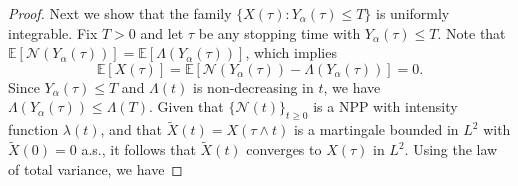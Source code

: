 \documentclass[11pt,oneside,reqno]{amsart}
\theoremstyle{definition}
\theoremstyle{remarkstyle}
\begin{document}
\begin{proof}
 Next we show that the family \(\{X(\tau):Y_\alpha(\tau)\le T\}\) is uniformly integrable. Fix \(T>0\) and let \(\tau\) be any stopping time with \(Y_\alpha(\tau)\le T\). Note that  $\mathbb{E}\left[\mathcal{N}(Y_\alpha(\tau))\right]=\mathbb{E}\left[\Lambda(Y_\alpha(\tau))\right]$, which implies 
 \begin{equation}\label{mean_nfpp_martingale}
     \mathbb{E}\left[X(\tau)\right]=\mathbb{E}\left[\mathcal{N}(Y_\alpha(\tau))-\Lambda(Y_\alpha(\tau))\right]=0.
 \end{equation}
Since $Y_{\alpha}(\tau) \le T$ and $\Lambda(t)$ is non-decreasing in $t$, we have $\Lambda\!\left(Y_{\alpha}(\tau)\right) \le \Lambda(T)$. Given that \(\{\mathcal{N}(t)\}_{t\ge 0}\) is a NPP with intensity function \(\lambda(t)\), and that \(\widetilde{X}(t)=X(\tau\wedge t)\) is a martingale bounded in \(L^2\) with \(\widetilde{X}(0)=0\) a.s., it follows that \(\widetilde{X}(t)\) converges to \(X(\tau)\) in \(L^2\). Using the law of total variance, we have 

\end{proof}
\end{document}

